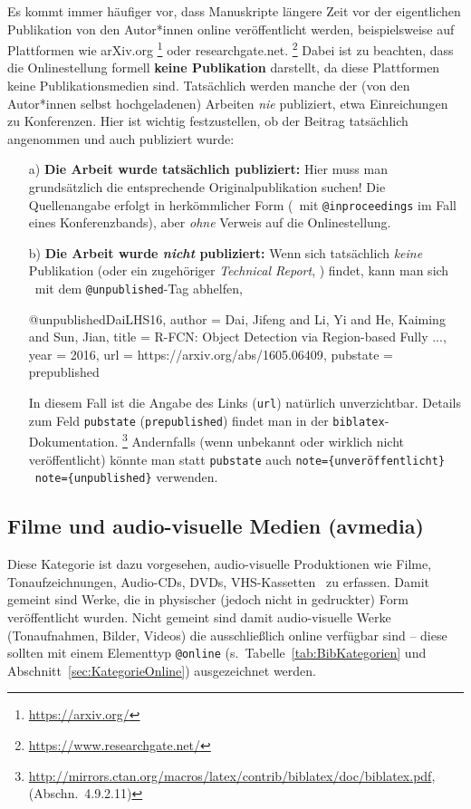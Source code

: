 Es kommt immer häufiger vor, dass Manuskripte längere Zeit vor der eigentlichen Pub\-likation
von den Autor*innen online veröffentlicht werden,
beispielsweise auf Plattformen wie \textsf{arXiv.org}%
\footnote{\url{https://arxiv.org/}}
oder \textsf{researchgate.net}.%
\footnote{\url{https://www.researchgate.net/}}
Dabei ist zu beachten, dass die Onlinestellung formell \textbf{keine Publikation}
darstellt, da diese Plattformen keine Publikationsmedien sind.
Tatsächlich werden manche der (von den Autor*innen selbst hochgeladenen) Arbeiten \emph{nie}
publiziert, etwa Einreichungen zu Konferenzen.
Hier ist wichtig festzustellen, ob der Beitrag tatsächlich
angenommen und auch publiziert wurde:
%
\begin{itemize}
\item[a)]
\textbf{Die Arbeit wurde tatsächlich publiziert:} Hier muss man grundsätzlich die 
entsprechende Original\-publikation suchen! 
Die Quellenangabe erfolgt in herkömmlicher Form (\zB\ mit \texttt{@inproceedings} 
im Fall eines Konferenzbands), aber \emph{ohne} Verweis auf die Onlinestellung.
\item[b)]
\textbf{Die Arbeit wurde \emph{nicht} publiziert:} Wenn sich tatsächlich \emph{keine} 
Publikation (oder ein zugehöriger \emph{Technical Report}, \so) findet,  kann man sich 
\evtl\ mit dem \texttt{@unpublished}-Tag abhelfen, \zB\ \cite{DaiLHS16}
\begin{GenericCode}[numbers=none]
@unpublished{DaiLHS16,
  author = {Dai, Jifeng and Li, Yi and He, Kaiming and Sun, Jian},
  title = {{R-FCN:} Object Detection via Region-based Fully ...},
  year = {2016},
  url = {https://arxiv.org/abs/1605.06409},
  pubstate = {prepublished}
}
\end{GenericCode}
In diesem Fall ist die Angabe des Links (\texttt{url}) natürlich unverzichtbar. 
Details zum Feld \texttt{pubstate} (\texttt{prepublished}) findet man in der
\texttt{biblatex}-Dokumentation.%
\footnote{\url{http://mirrors.ctan.org/macros/latex/contrib/biblatex/doc/biblatex.pdf},
(Abschn.\ 4.9.2.11)}
Andernfalls (wenn unbekannt oder wirklich nicht veröffentlicht) könnte man 
statt \texttt{pubstate} auch \texttt{note=\{unveröffentlicht\}} 
\bzw\ \texttt{note=\{unpublished\}} verwenden.
\end{itemize}



\subsection{Filme und audio-visuelle Medien (\textsf{avmedia})}
\label{sec:KategorieAvmedia}
Diese Kategorie ist dazu vorgesehen, audio-visuelle Produktionen wie Filme, 
Tonaufzeichnungen, Audio-CDs, DVDs, VHS-Kassetten \usw\ zu erfassen.
Damit gemeint sind Werke, die in physischer (jedoch nicht in gedruckter) Form
veröffentlicht wurden.
Nicht gemeint sind damit audio-visuelle Werke (Tonaufnahmen, Bilder, Videos) 
die ausschließlich online verfügbar sind -- diese sollten mit einem Elementtyp 
\texttt{@online} (s.\ Tabelle~\ref{tab:BibKategorien} und Abschnitt~\ref{sec:KategorieOnline}) ausgezeichnet werden.

